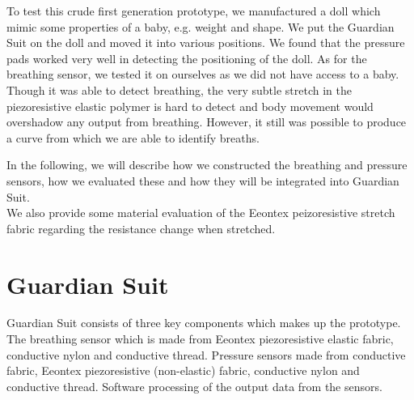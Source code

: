 \documentclass{sigchi-ext}
\begin{document}

To test this crude first generation prototype, we manufactured a doll which 
mimic some properties of a baby, e.g. weight and shape. We put the Guardian Suit
on the doll and moved it into various positions. We found that the pressure pads
worked very well in detecting the positioning of the doll. As for the breathing
sensor, we tested it on ourselves as we did not have access to a baby. Though
it was able to detect breathing, the very subtle stretch in the piezoresistive
elastic polymer is hard to detect and body movement would overshadow any output
from breathing. However, it still was possible to produce a curve from which 
we are able to identify breaths.

In the following, we will describe how we constructed
the breathing and pressure sensors, how we evaluated
these and how they will be integrated into Guardian Suit.\\
We also provide some material evaluation of the Eeontex
peizoresistive stretch fabric regarding the resistance
change when stretched.

\section{Guardian Suit}
Guardian Suit consists of three key components which
makes up the prototype. The breathing sensor which is
made from Eeontex piezoresistive elastic fabric, conductive
nylon and conductive thread. Pressure sensors made
from conductive fabric, Eeontex piezoresistive (non-elastic)
fabric, conductive nylon and conductive thread. Software
processing of the output data from the sensors.
\end{document}
